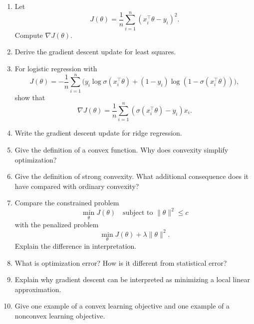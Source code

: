 \begin{enumerate}
    \item Let
    \[
    J(\theta)=\frac1n\sum_{i=1}^n (x_i^\top\theta-y_i)^2.
    \]
    Compute $\nabla J(\theta)$.

    \item Derive the gradient descent update for least squares.

    \item For logistic regression with
    \[
    J(\theta)= -\frac1n\sum_{i=1}^n \Big(y_i\log \sigma(x_i^\top\theta)+(1-y_i)\log(1-\sigma(x_i^\top\theta))\Big),
    \]
    show that
    \[
    \nabla J(\theta)=\frac1n\sum_{i=1}^n (\sigma(x_i^\top\theta)-y_i)x_i.
    \]

    \item Write the gradient descent update for ridge regression.

    \item Give the definition of a convex function. Why does convexity simplify optimization?

    \item Give the definition of strong convexity. What additional consequence does it have compared with ordinary convexity?

    \item Compare the constrained problem
    \[
    \min_\theta J(\theta)\quad \text{subject to } \|\theta\|^2\le c
    \]
    with the penalized problem
    \[
    \min_\theta J(\theta)+\lambda \|\theta\|^2.
    \]
    Explain the difference in interpretation.

    \item What is optimization error? How is it different from statistical error?

    \item Explain why gradient descent can be interpreted as minimizing a local linear approximation.

    \item Give one example of a convex learning objective and one example of a nonconvex learning objective.
\end{enumerate}